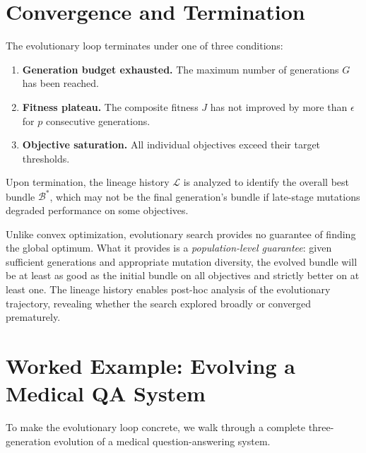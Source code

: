 \section{Convergence and Termination}
\label{sec:convergence}

The evolutionary loop terminates under one of three conditions:

\begin{enumerate}[leftmargin=1.5em]
  \item \textbf{Generation budget exhausted.} The maximum number of generations $G$ has been reached.
  \item \textbf{Fitness plateau.} The composite fitness $J$ has not improved by more than $\epsilon$ for $p$ consecutive generations.
  \item \textbf{Objective saturation.} All individual objectives exceed their target thresholds.
\end{enumerate}

Upon termination, the lineage history $\mathcal{L}$ is analyzed to identify the overall best bundle $\mathcal{B}^*$, which may not be the final generation's bundle if late-stage mutations degraded performance on some objectives.

\begin{keyinsight}
Unlike convex optimization, evolutionary search provides no guarantee of finding the global optimum. What it provides is a \emph{population-level guarantee}: given sufficient generations and appropriate mutation diversity, the evolved bundle will be at least as good as the initial bundle on all objectives and strictly better on at least one. The lineage history enables post-hoc analysis of the evolutionary trajectory, revealing whether the search explored broadly or converged prematurely.
\end{keyinsight}

\section{Worked Example: Evolving a Medical QA System}
\label{sec:evo-worked-example}

To make the evolutionary loop concrete, we walk through a complete three-generation evolution of a medical question-answering system.

